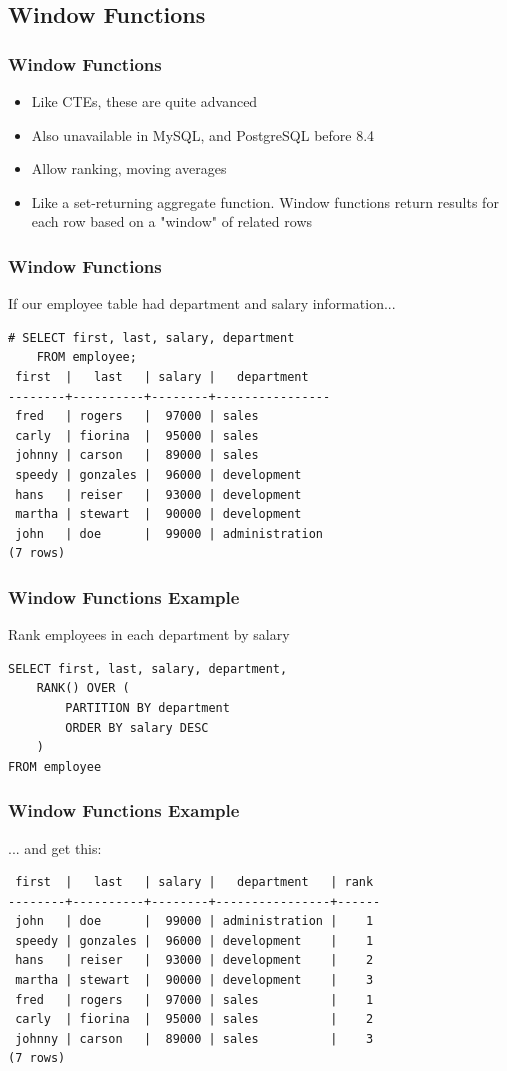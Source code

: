 \documentclass{beamer}
\begin{document}
\subsection{Window Functions}
\begin{frame}
    \frametitle{Window Functions}
    \begin{itemize}
        \item Like CTEs, these are quite advanced
        \item Also unavailable in MySQL, and PostgreSQL before 8.4
        \item Allow ranking, moving averages
        \item Like a set-returning aggregate function. Window functions return results for each row based on a "window" of related rows
    \end{itemize}
\end{frame}

\begin{frame}[fragile]
    \frametitle{Window Functions}
    If our employee table had department and salary information...
    \begin{verbatim}
# SELECT first, last, salary, department
    FROM employee;
 first  |   last   | salary |   department
--------+----------+--------+----------------
 fred   | rogers   |  97000 | sales
 carly  | fiorina  |  95000 | sales
 johnny | carson   |  89000 | sales
 speedy | gonzales |  96000 | development
 hans   | reiser   |  93000 | development
 martha | stewart  |  90000 | development
 john   | doe      |  99000 | administration
(7 rows)
    \end{verbatim}
\end{frame}

\begin{frame}[fragile]
    \frametitle{Window Functions Example}
    Rank employees in each department by salary
    \begin{verbatim}
SELECT first, last, salary, department,
    RANK() OVER (
        PARTITION BY department
        ORDER BY salary DESC
    )
FROM employee
    \end{verbatim}
\end{frame}

\begin{frame}[fragile]
    \frametitle{Window Functions Example}
    ... and get this:
    \footnotesize
    \begin{verbatim}
 first  |   last   | salary |   department   | rank
--------+----------+--------+----------------+------
 john   | doe      |  99000 | administration |    1
 speedy | gonzales |  96000 | development    |    1
 hans   | reiser   |  93000 | development    |    2
 martha | stewart  |  90000 | development    |    3
 fred   | rogers   |  97000 | sales          |    1
 carly  | fiorina  |  95000 | sales          |    2
 johnny | carson   |  89000 | sales          |    3
(7 rows)
    \end{verbatim}
    \normalsize
\end{frame}
\end{document}
